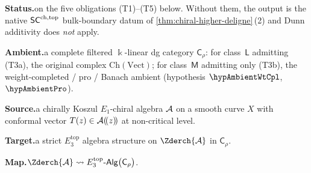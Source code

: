 \begin{theorem}%
\label{thm:topologisation-by-stress-tensor-null-homotopy}%
%
%
%

\noindent\textbf{Status.}\enspace \ClaimStatusConditional on the five
obligations \textup{(T1)}--\textup{(T5)} below.  Without them, the
output is the native $\mathsf{SC}^{\mathrm{ch},\mathrm{top}}$ bulk-boundary datum of
\cref{thm:chiral-higher-deligne}\,(2) and Dunn additivity does
\emph{not} apply.

\noindent\textbf{Ambient.}\enspace a complete filtered $\Bbbk$-linear
dg category $\mathsf{C}_{\rho}$: for class~$\mathsf{L}$ admitting
\textup{(T3a)}, the original complex $\mathrm{Ch}(\mathrm{Vect})$;
for class~$\mathsf{M}$ admitting only \textup{(T3b)}, the
weight-completed / pro / Banach ambient (hypothesis
$\hypAmbientWtCpl$, $\hypAmbientPro$).

\noindent\textbf{Source.}\enspace a chirally Koszul $E_{1}$-chiral
algebra $\mathcal{A}$ on a smooth curve $X$ with conformal vector $T(z) \in
\mathcal{A}(\!(z)\!)$ at non-critical level.

\noindent\textbf{Target.}\enspace a strict $E_{3}^{\mathrm{top}}$
algebra structure on $\Zderch{\cA}$ in $\mathsf{C}_{\rho}$.

\noindent\textbf{Map.}\enspace $\Zderch{\cA} \rightsquigarrow
E_{3}^{\mathrm{top}}\text{-}\mathsf{Alg}\bigl(\mathsf{C}_{\rho}\bigr)$.


\end{theorem}
